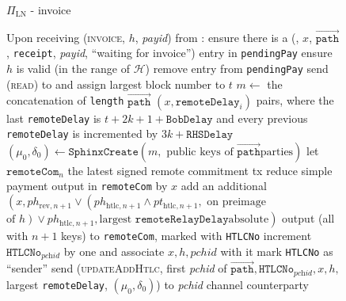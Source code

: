 \begin{figure}[!htbp]
\begin{protocolbox}{$\Pi_{\mathrm{LN}}$ - invoice}
\begin{algorithmic}[1]
    \State Upon receiving (\textsc{invoice}, $h$, \textit{payid}) from \bob:
    \Indent
      \State ensure there is a (\bob, $x$, $\overrightarrow{\mathtt{path}}$,
      \texttt{receipt}, \textit{payid}, ``waiting for invoice'') entry in
      \texttt{pendingPay}
      \State ensure $h$ is valid (in the range of $\mathcal{H}$)
      \State remove entry from \texttt{pendingPay}
      \State send (\textsc{read}) to \ledger{} and assign largest block number
      to $t$
      \State $m \gets$ the concatenation of \texttt{length}
      $\overrightarrow{\mathtt{path}}$ $\left(x, \mathtt{remoteDelay}_i\right)$
      pairs, where the last \texttt{remoteDelay} is $t + 2k + 1 +
      \mathtt{BobDelay}$ and every previous \texttt{remoteDelay} is incremented
      by $3k + \mathtt{RHSDelay}$ 
      \State $\left(\mu_0, \delta_0\right) \gets \mathtt{SphinxCreate}\left(m,
      \text{ public keys of } \overrightarrow{\mathtt{path}} \text{
      parties}\right)$
      \State let $\mathtt{remoteCom}_n$ the latest signed remote commitment tx
      \State reduce simple payment output in \texttt{remoteCom} by $x$
      \State add an additional $\left(x, ph_{\mathrm{rev}, n+1} \vee
      \left(ph_{\mathrm{htlc}, n+1} \wedge pt_{\mathrm{htlc}, n+1}, \text{ on
      preimage}\right.\right.$ $\left.\left.\text{of } h\right) \vee
      ph_{\mathrm{htlc}, n+1}, \text{largest } \mathtt{remoteRelayDelay} \text{
      absolute}\right)$ output (all with $n+1$ keys) to \texttt{remoteCom},
      marked with \texttt{HTLCNo}
      \State increment $\mathtt{HTLCNo}_{\textit{pchid}}$ by one and associate
      $x, h, \mathit{pchid}$ with it
      \State mark \texttt{HTLCNo} as ``sender''
      \State send (\textsc{updateAddHtlc}, first \textit{pchid} of
      $\overrightarrow{\mathtt{path}}, \mathtt{HTLCNo}_{\textit{pchid}}, x, h,$
      largest \texttt{remoteDelay}, $\left(\mu_0, \delta_0\right)$) to
      \textit{pchid} channel counterparty
    \EndIndent
  \end{algorithmic}
\end{protocolbox}
\caption{}
\label{alg:protocol:pay:invoice}
\end{figure}

